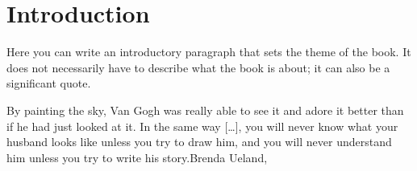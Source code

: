 
\thispagestyle{empty}


\chapter{Introduction}\label{epigraph:cha}

Here you can write an introductory paragraph that sets the theme of the book. It does not necessarily have to describe what the book is about; it can also be a significant quote.

\begin{myquotation} By painting the sky, Van Gogh was really able to see it and adore it better than if he had just looked at it. In the same way [\dots], you will never know what your husband looks like unless you try to draw him, and you will never understand him unless you try to write his story.\mbox{}\hfill \emdash{}Brenda Ueland,  \ifxetex\label{gogh-sky-quote}\else\citep[pp.~23--24]{ifyouwanttowrite}\fi\par\end{myquotation}

\hfil{}\hfil